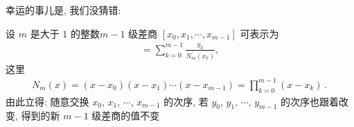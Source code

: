 幸运的事儿是, 我们没猜错:

\begin{proposition}
    设 $m$ 是大于 $1$ 的整数\period $m - 1$ 级差商 $[x_0, x_1, \cdots, x_{m-1}]$ 可表示为
    \begin{align*}
        [x_0, x_1, \cdots, x_{m-1}] = \sum_{k = 0}^{m-1} \frac{y_k}{N_m^{\prime} (x_k)},
    \end{align*}
    这里
    \begin{align*}
        N_m (x) = (x - x_0)(x - x_1) \cdots (x - x_{m-1}) = \prod_{k=0}^{m-1} (x - x_k) \period
    \end{align*}
    由此立得: 随意交换 $x_0$, $x_1$, $\cdots$, $x_{m-1}$ 的次序, 若 $y_0$, $y_1$, $\cdots$, $y_{m-1}$ 的次序也跟着改变, 得到的新 $m - 1$ 级差商的值不变\period
\end{proposition}

